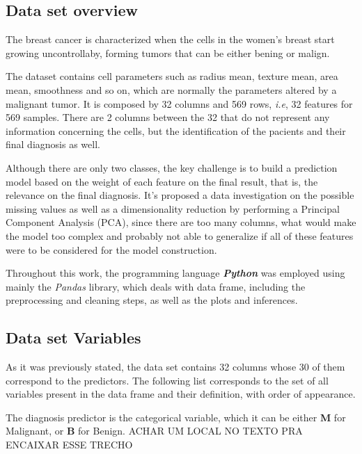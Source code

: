 \documentclass[conference]{IEEEtran}
\newcommand{\reviewUrgent}[1]{{\color{red} #1}} %
\begin{document}
\subsection{Data set overview}

The breast cancer is characterized when the cells in the women's breast start
growing uncontrollaby, forming tumors that can be either bening or malign. 

The dataset contains cell parameters such as radius mean, texture mean, area mean, 
smoothness and so on, which are normally the parameters altered by a malignant
tumor. 
It is composed by 32 columns and 569 rows, \textit{i.e}, 32 features 
for 569 samples. There are 2 columns between the 32 that do not represent any 
information concerning the cells, but the identification of the pacients and 
their final diagnosis as well. 

Although there are only two classes, the key challenge is to build a prediction
model based on the weight of each feature on the final result, that is, the relevance
on the final diagnosis. It's proposed a data investigation on the possible missing values as 
well as a dimensionality reduction by performing a Principal Component Analysis (PCA), 
since there are too many columns, what would make the model too complex and probably not able 
to generalize if all of these features were to be considered for the model construction. 

Throughout this work, the programming language \textit{\textbf{Python}} was employed 
using mainly the \textit{Pandas} library, which deals with data frame, including the 
preprocessing and cleaning steps, as well as the plots and inferences. 


\subsection{Data set Variables}

As it was previously stated, the data set contains 32 columns whose 30 of them 
correspond to the predictors. The following list corresponds to the set of all 
variables present in the data frame and their definition, with order of appearance. 

The diagnosis predictor is the categorical variable, which it can be either \textbf{M} for Malignant, or \textbf{B} for Benign. 
\reviewUrgent{ACHAR UM LOCAL NO TEXTO PRA ENCAIXAR ESSE TRECHO}
\end{document}
